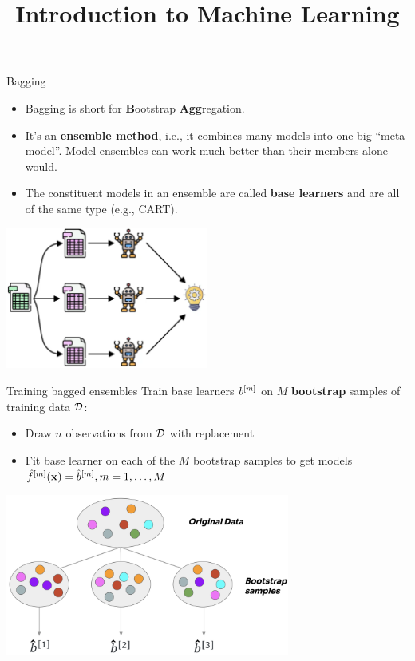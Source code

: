 \documentclass[11pt,compress,t,notes=noshow, xcolor=table]{beamer}
\title{Introduction to Machine Learning}
\institute{\href{https://compstat-lmu.github.io/lecture_i2ml/}{compstat-lmu.github.io/lecture\_i2ml}}
\date{}
\begin{document}
\sloppy


\begin{vbframe}{Bagging}

\begin{itemize}
  \item Bagging is short for \textbf{B}ootstrap \textbf{Agg}regation.
  \item It's an \textbf{ensemble method}, i.e., it combines many models into one big \enquote{meta-model}. Model ensembles can work much better than their members alone would.
  \item The constituent models in an ensemble are called \textbf{base learners} and are all of the same type (e.g., CART).
  
\end{itemize}
\begin{center}
\includegraphics[width=0.5\textwidth]{figure_man/bagging.png}
\end{center}

\end{vbframe}

\begin{vbframe}{Training bagged ensembles}
Train base learners $b^{[m]}$ on $M$ \textbf{bootstrap} samples of training data $\mathcal{D}$:
\begin{itemize}
  \item Draw $n$ observations from $\mathcal{D}$ with replacement
  \item Fit base learner on each of the $M$ bootstrap samples to get models $\hat{f}^{[m]}(\mathbf{x}) = \hat{b}^{[m]}, m = 1, \dots, M$
\end{itemize}

\begin{center}
\includegraphics[width=0.7\textwidth]{figure_man/forest-bagging.png}
\end{center}

\end{vbframe}
\end{document}

